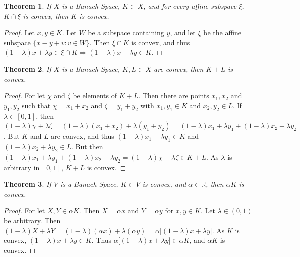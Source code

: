 \documentclass[12pt,oneside]{book}
\theoremstyle{mystyle}
\newtheorem{theorem}{Theorem}[section]
\begin{document}
\begin{theorem}
If $X$ is a Banach Space, $K\subset X$, and for every affine subspace $\xi$, $K\cap \xi$ is convex, then $K$ is convex.
\end{theorem}
\begin{proof}
Let $x,y\in K$. Let $W$ be a subspace containing $y$, and let $\xi$ be the affine subspace $\{x-y+v:v\in W\}$. Then $\xi\cap K$ is convex, and thus $(1-\lambda)x+\lambda y \in \xi \cap K \Rightarrow (1-\lambda)x+\lambda y \in K$.
\end{proof}

\begin{theorem}
If $X$ is a Banach Space, $K,L\subset X$ are convex, then $K+L$ is convex.
\end{theorem}
\begin{proof}
For let $\chi$ and $\zeta$ be elements of $K+L$. Then there are points $x_1,x_2$ and $y_1,y_2$ such that $\chi=x_1+x_2$ and $\zeta = y_1+y_2$ with $x_1,y_1\in K$ and $x_2,y_2\in L$. If $\lambda \in [0,1]$, then $(1-\lambda)\chi + \lambda \zeta = (1-\lambda)(x_1+x_2)+\lambda(y_1+y_2) = (1-\lambda)x_1 + \lambda y_1 + (1-\lambda)x_2 + \lambda y_2$. But $K$ and $L$ are convex, and thus $(1-\lambda)x_1 + \lambda y_1 \in K$ and $(1-\lambda)x_2 + \lambda y_2 \in L$. But then $(1-\lambda)x_1 + \lambda y_1 + (1-\lambda)x_2 + \lambda y_2=(1-\lambda)\chi + \lambda \zeta\in K+L$. As $\lambda$ is arbitrary in $[0,1]$, $K+L$ is convex.
\end{proof}

\begin{theorem}
If $V$ is a Banach Space, $K\subset V$ is convex, and $\alpha \in \mathbb{R}$, then $\alpha K$ is convex.
\end{theorem}
\begin{proof}
For let $X,Y\in \alpha K$. Then $X = \alpha x$ and $Y = \alpha y$ for $x,y\in K$. Let $\lambda \in (0,1)$ be arbitrary. Then $(1-\lambda)X+\lambda Y =(1-\lambda)(\alpha x)+\lambda (\alpha y) = \alpha\big[(1-\lambda)x+\lambda y\big]$. As $K$ is convex, $(1-\lambda)x+\lambda y \in K$. Thus $\alpha\big[(1-\lambda)x+\lambda y\big] \in \alpha K$, and $\alpha K$ is convex.
\end{proof}
\end{document}
